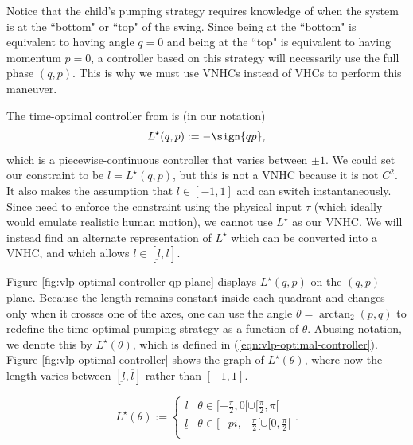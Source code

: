 Notice that the child's pumping strategy requires knowledge of
when the system is at the ``bottom" or ``top" of the swing. 
Since being at the ``bottom" is equivalent to having angle \(q = 0\) and being
at the ``top" is equivalent to having momentum \(p = 0\), a controller based on
this strategy will necessarily use the full phase \((q,p)\). 
This is why we must use VNHCs instead of VHCs to perform this maneuver.

The time-optimal controller from \cite{pumping_swing_standing_squatting} is (in
our notation)
\[
   L^\star(q,p) := -\sign{qp}
   ,
\]
which is a piecewise-continuous controller that varies between \(\pm 1\). 
We could set our constraint to be \(l = L^\star(q,p)\), but this is not a VNHC
because it is not \(C^2\).
It also makes the assumption that \(l \in [-1,1]\) and can switch
instantaneously.
Since need to enforce the constraint using the physical input \(\tau\) (which
ideally would emulate realistic human motion), we cannot use \(L^\star\) as our
VNHC.
We will instead find an alternate representation of \(L^\star\) which can be
converted into a VNHC, and which allows 
\(l \in [\underbar{l},\overbar{l}]\).

Figure \ref{fig:vlp-optimal-controller-qp-plane} displays \(L^\star(q,p)\) 
on the \((q,p)\)-plane.
Because the length remains constant inside each quadrant and changes only when it
crosses one of the axes, one can use the angle \(\theta = \arctan_2(p,q)\) to
redefine the time-optimal pumping strategy as a function of \(\theta\).
Abusing notation, we denote this by \(L^\star(\theta)\), which is defined in
(\ref{eqn:vlp-optimal-controller}).
Figure \ref{fig:vlp-optimal-controller} shows the graph of \(L^\star(\theta)\), 
where now the length varies between \([\underbar{l},\overbar{l}]\) rather than 
\([-1,1]\). 

\begin{equation}\label{eqn:vlp-optimal-controller}
   L^\star(\theta):= \begin{cases}
      \overline{l} & \theta \in [-\frac{\pi}{2},0[ \cup [\frac{\pi}{2}, \pi[ \\
      \underline{l} & \theta \in [-pi, -\frac{\pi}{2}[ \cup [0,\frac{\pi}{2}[ \\
   \end{cases}
   .
\end{equation}

